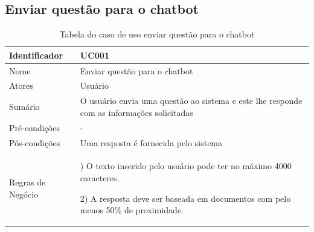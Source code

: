\documentclass[
	12pt,				%
	openright,			%
	oneside,			    %
	a4paper,				%
	english,			%
	french,			%
	spanish,			%
	brazil			%
	]{abntex2}
\begin{document}
\subsection{Enviar questão para o chatbot}
\begin{table}[htb]

\ABNTEXfontereduzida
\caption[Tabela do caso de uso enviar questão para o chatbot]{Tabela do caso de uso enviar questão para o chatbot}
\label{tab-nivinv}
\hspace*{2.5cm}
\begin{tabular}{|>{\centering\arraybackslash}m{2.5cm}|>{\centering\arraybackslash}m{8cm}|}
  \hline
    Identificador & UC001  \\ \hline
    Nome & Enviar questão para o chatbot  \\ \hline
    Atores & Usuário  \\ \hline
    Sumário & O usuário envia uma questão ao sistema e este lhe responde com as informações solicitadas  \\ \hline
    Pré-condições & -  \\ \hline
    Pós-condições & Uma resposta é fornecida pelo sistema  \\ \hline
    Regras de Negócio & 1) O texto inserido pelo usuário pode ter no máximo 4000 caracteres. 
     
    2) A resposta deve ser baseada em documentos com pelo menos 50\% de proximidade. \\ \hline
    
    
\end{tabular}
\end{table}
\end{document}

